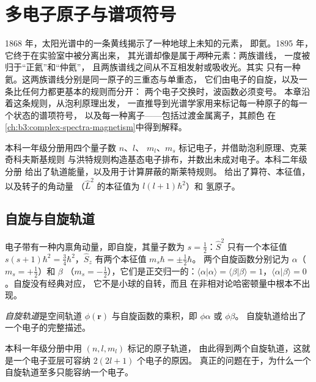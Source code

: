 \chapter{多电子原子与谱项符号}\label{ch:b3:many-electron-atoms}

1868 年，太阳光谱中的一条黄线揭示了一种地球上未知的元素，
即氦。1895 年，它终于在实验室中被分离出来，
其光谱却像是属于\emph{两}种元素：两族谱线，
一度被归于“正氦”和“仲氦”，
且两族谱线之间从不互相发射或吸收光。其实
只有一种氦。这两族谱线分别是同一原子的三重态与单重态，
它们由电子的自旋，以及一条比任何力都更基本的规则而分开：
两个电子交换时，波函数必须变号。
本章沿着这条规则，从泡利原理出发，
一直推导到光谱学家用来标记每一种原子的每一个状态的谱项符号，
以及每一种离子——包括过渡金属离子，其颜色
在\cref{ch:b3:complex-spectra-magnetism}中得到解释。

\begin{recall}
本科一年级分册用四个量子数 $n$、$l$、
$m_l$、$m_s$ 标记电子，并借助泡利原理、克莱奇科夫斯基规则
与洪特规则构造基态电子排布，并数出未成对电子。本科二年级分册
给出了轨道能量，以及用于计算屏蔽的斯莱特规则。
给出了算符、本征值，以及转子的角动量
（$\hat L^2$ 的本征值为 $l(l+1)\hbar^2$）和
氢原子。
\end{recall}

\section{自旋与自旋轨道}

电子带有一种内禀角动量，即自旋，其量子数为
$s = \frac12$：$\hat S^2$ 只有一个本征值 $s(s+1)\hbar^2 =
\frac34\hbar^2$，$\hat S_z$ 有两个本征值 $m_s\hbar = \pm\frac12\hbar$。
两个自旋函数分别记为 $\alpha$（$m_s = +\frac12$）和 $\beta$
（$m_s = -\frac12$），它们是正交归一的：$\langle\alpha|\alpha\rangle =
\langle\beta|\beta\rangle = 1$，$\langle\alpha|\beta\rangle = 0$。自旋没有经典对应，
它不是小球的自转，而且
在非相对论哈密顿量中根本不出现。

\begin{definition}[自旋轨道]\label{def:b3:many-electron-atoms:spin-orbital}
\emph{自旋轨道}是空间轨道
$\phi(\mathbf r)$ 与自旋函数的乘积，即 $\phi\alpha$ 或 $\phi\beta$。
自旋轨道给出了一个电子的完整描述。
\end{definition}

本科一年级分册中用 $(n, l, m_l)$ 标记的原子轨道，
由此得到两个自旋轨道，这就是一个电子亚层可容纳 $2(2l+1)$ 个电子的原因。
真正的问题在于，为什么一个自旋轨道至多只能容纳一个电子。

